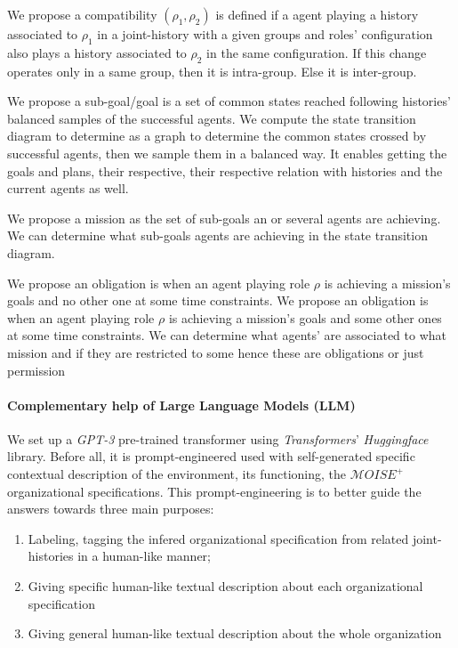 \documentclass{ecai}
\newcounter{relation}
\begin{document}
We propose a compatibility $(\rho_1,\rho_2)$ is defined if a agent playing a history associated to $\rho_1$ in a joint-history with a given groups and roles' configuration also plays a history associated to $\rho_2$ in the same configuration. If this change operates only in a same group, then it is intra-group. Else it is inter-group.

We propose a sub-goal/goal is a set of common states reached following histories' balanced samples of the successful agents.
We compute the state transition diagram to determine as a graph to determine the common states crossed by successful agents, then we sample them in a balanced way. It enables getting the goals and plans, their respective, their respective relation with histories and the current agents as well.

We propose a mission as the set of sub-goals an or several agents are achieving.
We can determine what sub-goals agents are achieving in the state transition diagram.

We propose an obligation is when an agent playing role $\rho$ is achieving a mission's goals and no other one at some time constraints.
We propose an obligation is when an agent playing role $\rho$ is achieving a mission's goals and some other ones at some time constraints.
We can determine what agents' are associated to what mission and if they are restricted to some hence these are obligations or just permission

\paragraph{Complementary help of Large Language Models (LLM)}
We set up a \emph{GPT-3} pre-trained transformer using \emph{Transformers}' \emph{Huggingface} library. Before all, it is prompt-engineered used with self-generated specific contextual description of the environment, its functioning, the $\mathcal{M}OISE^+$ organizational specifications. This prompt-engineering is to better guide the answers towards three main purposes:
\begin{enumerate}
    \item Labeling, tagging the infered organizational specification from related joint-histories in a human-like manner;
    \item Giving specific human-like textual description about each organizational specification
    \item Giving general human-like textual description about the whole organization
\end{enumerate}
\end{document}
